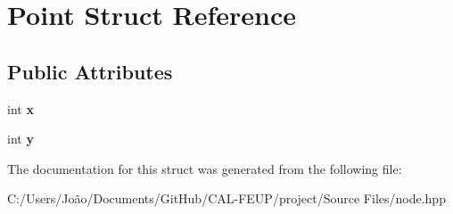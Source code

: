 \hypertarget{struct_point}{}\section{Point Struct Reference}
\label{struct_point}
\subsection*{Public Attributes}
\begin{DoxyCompactItemize}
\item 
\mbox{\label{struct_point_a8c779e11e694b20e0946105a9f5de842}} 
int {\bfseries x}
\item 
\mbox{\label{struct_point_a2e1b5fb2b2a83571f5c0bc0f66a73cf7}} 
int {\bfseries y}
\end{DoxyCompactItemize}


The documentation for this struct was generated from the following file\+:\begin{DoxyCompactItemize}
\item 
C\+:/\+Users/\+João/\+Documents/\+Git\+Hub/\+C\+A\+L-\/\+F\+E\+U\+P/project/\+Source Files/node.\+hpp\end{DoxyCompactItemize}
